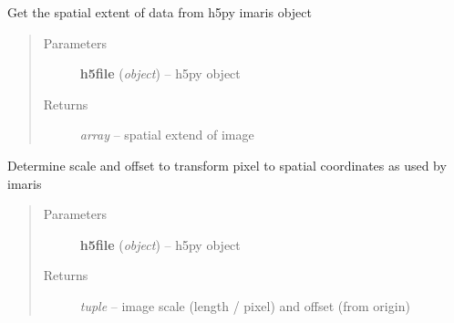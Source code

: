 \documentclass[letterpaper,10pt,english]{sphinxmanual}
\begin{document}

\begin{fulllineitems}
\label{api/ClearMap.IO:ClearMap.IO.Imaris.getDataExtent}
Get the spatial extent of data from h5py imaris object
\begin{quote}\begin{description}
\item[{Parameters}] \leavevmode
\textbf{h5file} (\emph{object}) --
h5py object

\item[{Returns}] \leavevmode
\emph{array} --
spatial extend of image

\end{description}\end{quote}

\end{fulllineitems}


\begin{fulllineitems}
\label{api/ClearMap.IO:ClearMap.IO.Imaris.getScaleAndOffset}
Determine scale and offset to transform pixel to spatial coordinates as used by imaris
\begin{quote}\begin{description}
\item[{Parameters}] \leavevmode
\textbf{h5file} (\emph{object}) --
h5py object

\item[{Returns}] \leavevmode
\emph{tuple} --
image scale (length / pixel) and offset (from origin)

\end{description}\end{quote}

\end{fulllineitems}

\end{document}
